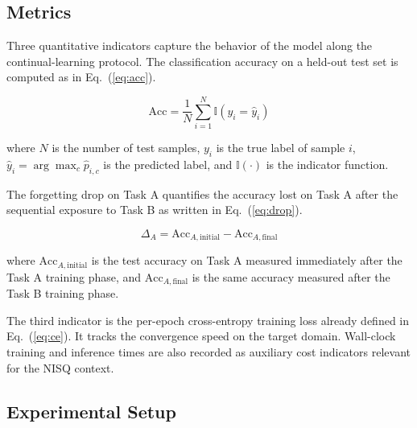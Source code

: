 \documentclass[conference]{IEEEtran}
\begin{document}
\subsection{Metrics}

Three quantitative indicators capture the behavior of the model along the continual-learning protocol. The classification accuracy on a held-out test set is computed as in Eq.~(\ref{eq:acc}).

\begin{equation}
\mathrm{Acc} = \frac{1}{N}\sum_{i=1}^{N} \mathbb{I}(y_i = \hat{y}_i)
\label{eq:acc}
\end{equation}

where $N$ is the number of test samples, $y_i$ is the true label of sample $i$, $\hat{y}_i = \arg\max_{c}\hat{p}_{i,c}$ is the predicted label, and $\mathbb{I}(\cdot)$ is the indicator function.

The forgetting drop on Task A quantifies the accuracy lost on Task A after the sequential exposure to Task B as written in Eq.~(\ref{eq:drop}).

\begin{equation}
\Delta_A = \mathrm{Acc}_{A,\text{initial}} - \mathrm{Acc}_{A,\text{final}}
\label{eq:drop}
\end{equation}

where $\mathrm{Acc}_{A,\text{initial}}$ is the test accuracy on Task A measured immediately after the Task A training phase, and $\mathrm{Acc}_{A,\text{final}}$ is the same accuracy measured after the Task B training phase.

The third indicator is the per-epoch cross-entropy training loss already defined in Eq.~(\ref{eq:ce}). It tracks the convergence speed on the target domain. Wall-clock training and inference times are also recorded as auxiliary cost indicators relevant for the NISQ context.

\subsection{Experimental Setup}
\end{document}
